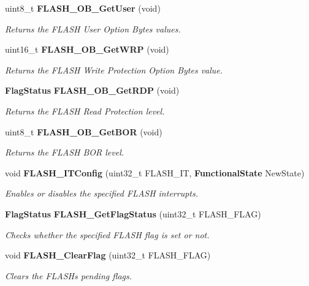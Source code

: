 \begin{DoxyCompactItemize}
uint8\+\_\+t \textbf{ F\+L\+A\+S\+H\+\_\+\+O\+B\+\_\+\+Get\+User} (void)
\begin{DoxyCompactList}\small\item\em Returns the F\+L\+A\+SH User Option Bytes values. \end{DoxyCompactList}\item 
uint16\+\_\+t \textbf{ F\+L\+A\+S\+H\+\_\+\+O\+B\+\_\+\+Get\+W\+RP} (void)
\begin{DoxyCompactList}\small\item\em Returns the F\+L\+A\+SH Write Protection Option Bytes value. \end{DoxyCompactList}\item 
\textbf{ Flag\+Status} \textbf{ F\+L\+A\+S\+H\+\_\+\+O\+B\+\_\+\+Get\+R\+DP} (void)
\begin{DoxyCompactList}\small\item\em Returns the F\+L\+A\+SH Read Protection level. \end{DoxyCompactList}\item 
uint8\+\_\+t \textbf{ F\+L\+A\+S\+H\+\_\+\+O\+B\+\_\+\+Get\+B\+OR} (void)
\begin{DoxyCompactList}\small\item\em Returns the F\+L\+A\+SH B\+OR level. \end{DoxyCompactList}\item 
void \textbf{ F\+L\+A\+S\+H\+\_\+\+I\+T\+Config} (uint32\+\_\+t F\+L\+A\+S\+H\+\_\+\+IT, \textbf{ Functional\+State} New\+State)
\begin{DoxyCompactList}\small\item\em Enables or disables the specified F\+L\+A\+SH interrupts. \end{DoxyCompactList}\item 
\textbf{ Flag\+Status} \textbf{ F\+L\+A\+S\+H\+\_\+\+Get\+Flag\+Status} (uint32\+\_\+t F\+L\+A\+S\+H\+\_\+\+F\+L\+AG)
\begin{DoxyCompactList}\small\item\em Checks whether the specified F\+L\+A\+SH flag is set or not. \end{DoxyCompactList}\item 
void \textbf{ F\+L\+A\+S\+H\+\_\+\+Clear\+Flag} (uint32\+\_\+t F\+L\+A\+S\+H\+\_\+\+F\+L\+AG)
\begin{DoxyCompactList}\small\item\em Clears the F\+L\+A\+SH\textquotesingle{}s pending flags. \end{DoxyCompactList}\item 

\end{DoxyCompactItemize}
